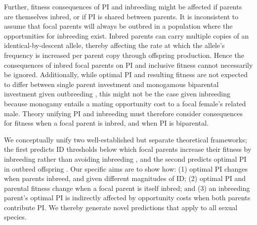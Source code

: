 \documentclass[12pt]{article}
\begin{document}
Further, fitness consequences of PI and inbreeding might be affected if parents are themselves inbred, or if PI is shared between parents. It is inconsistent to assume that focal parents will always be outbred in a population where the opportunities for inbreeding exist. Inbred parents can carry multiple copies of an identical-by-descent allele, thereby affecting the rate at which the allele's frequency is increased per parent copy through offspring production. Hence the consequences of inbred focal parents on PI and inclusive fitness cannot necessarily be ignored. Additionally, while optimal PI and resulting fitness are not expected to differ between single parent investment and monogamous biparental investment given outbreeding \cite[][]{Parker1985}, this might not be the case given inbreeding because monogamy entails a mating opportunity cost \cite[][]{Waser1986} to a focal female's related male. Theory unifying PI and inbreeding must therefore consider consequences for fitness when a focal parent is inbred, and when PI is biparental. %

We conceptually unify two well-established but separate theoretical frameworks; the first predicts ID thresholds below which focal parents increase their fitness by inbreeding rather than avoiding inbreeding \cite[][]{Parker1979}, and the second predicts optimal PI in outbred offspring \cite[][]{Macnair1978}. Our specific aims are to show how: (1) optimal PI changes when parents inbreed, and given different magnitudes of ID; (2) optimal PI and parental fitness change when a focal parent is itself inbred; and (3) an inbreeding parent's optimal PI is indirectly affected by opportunity costs when both parents contribute PI. We thereby generate novel predictions that apply to all sexual species. %

\end{document}
